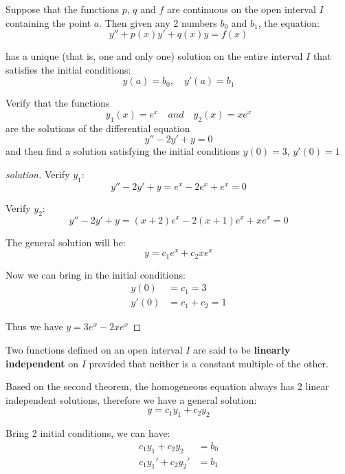 \begin{theorem}
    Suppose that the functions \(p\), \(q\) and \(f\) are continuous on the open interval \(I\)  containing the point \(a\).  
    Then given any 2 numbers \(b_0\) and \(b_1\), the equation:
    \[
        y'' + p(x)y' + q(x)y = f(x)
    \]
    
    has a unique (that is, one and only one) solution on the entire interval \(I\) that satisfies the initial conditions:
    \[
        y(a) = b_0, \quad y'(a) = b_1
    \] 
\end{theorem}

\begin{example}
    Verify that the functions
    \[
        y_1(x) = e^x \quad and \quad y_2(x) = x e^x
    \]
    are the solutions of the differential equation
    \[
        y'' - 2y' + y = 0
    \]
    and then find a solution satisfying the initial conditions \( y(0) = 3\), \(y'(0) = 1\)  
\end{example}
\begin{proof}[solution]
    Verify \(y_1\):
    \[
        y'' - 2y' + y = e^x - 2e^x + e^x = 0
    \] 

    Verify \(y_2\):
    \[
        y'' - 2y' + y = (x + 2)e^x - 2(x+1)e^x + xe^x = 0
    \] 

    The general solution will be:
    \[
        y = c_1e^x + c_2 xe^x
    \]

    Now we can bring in the initial conditions:
    \begin{align*}
        y(0) &= c_1 = 3  \\
        y'(0) &= c_1 + c_2 = 1
    \end{align*}

    Thus we have \(y = 3e^x -2xe^x\) 
\end{proof}

\begin{definition}
    Two functions defined on an open interval \(I\) are said to be \textbf{linearly independent} on \(I\) provided that neither is a constant multiple of the other.   
\end{definition}

Based on the second theorem, the homogeneous equation always has 2 linear independent solutions, therefore we have a general solution:
\[
    y = c_1y_1 + c_2y_2
\]

Bring 2 initial conditions, we can have:
\begin{align*}
    c_1y_1 + c_2y_2 &= b_0 \\
    c_1y_1' + c_2y_2' &= b_1
\end{align*}

